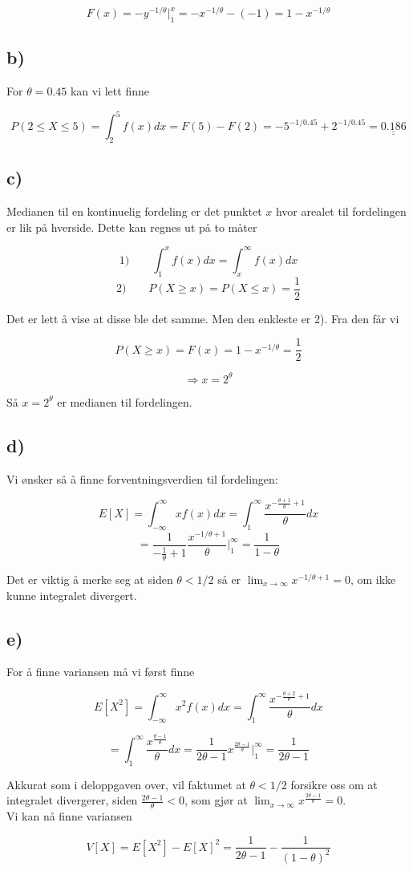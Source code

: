 \documentclass[a4paper,norsk, 10pt]{article}
\begin{document}
$$
F(x) = -y^{-1/\theta}\bigg\vert_1^x = -x^{-1/\theta} - (-1) = 1 -x^{-1/\theta}
$$

\subsection*{b)}

For $\theta = 0.45$ kan vi lett finne

$$
P(2 \leq X \leq 5) = \int_2^5 f(x) dx = F(5)-F(2) = -5^{-1/0.45} + 2^{-1/0.45} = \underline{\underline{0.186}}
$$

\subsection*{c)}

Medianen til en kontinuelig fordeling er det punktet $x$ hvor arealet til fordelingen er lik på hverside. Dette kan regnes ut på to måter

$$
1) \qquad \int_{1}^x f(x) dx = \int_x^{\infty} f(x) dx
$$
$$
2) \qquad P(X \geq x) = P(X \leq x) = \frac{1}{2}
$$

Det er lett å vise at disse ble det samme. Men den enkleste er 2). Fra den får vi 

$$
P(X \geq x) = F(x) = 1-x^{-1/\theta} = \frac{1}{2}
$$

$$
\Rightarrow x = 2^{\theta}
$$

Så $x = 2^{\theta}$ er medianen til fordelingen.

\subsection*{d)}
Vi ønsker så å finne forventningsverdien til fordelingen:

$$
E[X] = \int_{-\infty}^{\infty} xf(x) dx = \int_1^{\infty} \frac{x^{-\frac{\theta +1}{\theta} + 1}}{\theta} dx
$$
$$
= \frac{1}{-\frac{1}{\theta} + 1}\frac{x^{-1/\theta + 1}}{\theta} \bigg\vert_1^{\infty} = \frac{1}{1-\theta}
$$

Det er viktig å merke seg at siden $\theta < 1/2$ så er $\lim_{x \rightarrow \infty} x^{-1/\theta + 1} = 0$, om ikke kunne integralet divergert.


\subsection*{e)}

For å finne variansen må vi først finne

$$
E[X^2] = \int_{-\infty}^{\infty} x^2f(x) dx = \int_1^{\infty} \frac{x^{-\frac{\theta +2}{\theta} + 1}}{\theta} dx
$$

$$
= \int_1^{\infty} \frac{x^{\frac{\theta -1}{\theta}}}{\theta} dx = \frac{1}{2\theta - 1}x^{\frac{2\theta - 1}{\theta}} \bigg\vert_1^{\infty} = \frac{1}{2\theta - 1}
$$

Akkurat som i deloppgaven over, vil faktumet at $\theta < 1/2$ forsikre oss om at integralet divergerer, siden $\frac{2\theta - 1 }{\theta} < 0$, som gjør at $\lim_{x \rightarrow \infty} x^{\frac{2\theta -1}{\theta}} = 0$.\\

Vi kan nå finne variansen

$$
V[X] = E[X^2] - E[X]^2 = \frac{1}{2\theta -1} - \frac{1}{(1-\theta) ^2}
$$ 
\end{document}
